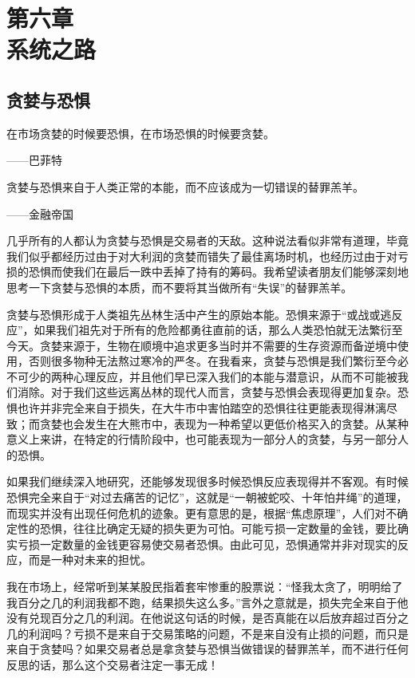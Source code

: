\section[第六章\q 系统之路]{第六章\\ 系统之路}

\subsection{贪婪与恐惧}

{\kaishu
在市场贪婪的时候要恐惧，在市场恐惧的时候要贪婪。

\hfill ——巴菲特

贪婪与恐惧来自于人类正常的本能，而不应该成为一切错误的替罪羔羊。

\hfill ——金融帝国
}

几乎所有的人都认为贪婪与恐惧是交易者的天敌。这种说法看似非常有道理，毕竟我们似乎都经历过由于对大利润的贪婪而错失了最佳离场时机，也经历过由于对亏损的恐惧而使我们在最后一跌中丢掉了持有的筹码。我希望读者朋友们能够深刻地思考一下贪婪与恐惧的本质，而不要将其当做所有“失误”的替罪羔羊。

贪婪与恐惧形成于人类祖先丛林生活中产生的原始本能。恐惧来源于“或战或逃反应”，如果我们祖先对于所有的危险都勇往直前的话，那么人类恐怕就无法繁衍至今天。贪婪来源于，生物在顺境中追求更多当时并不需要的生存资源而备逆境中使用，否则很多物种无法熬过寒冷的严冬。在我看来，贪婪与恐惧是我们繁衍至今必不可少的两种心理反应，并且他们早已深入我们的本能与潜意识，从而不可能被我们消除。对于我们这些远离丛林的现代人而言，贪婪与恐惧会表现得更加复杂。恐惧也许并非完全来自于损失，在大牛市中害怕踏空的恐惧往往更能表现得淋漓尽致；而贪婪也会发生在大熊市中，表现为一种希望以更低价格买入的贪婪。从某种意义上来讲，在特定的行情阶段中，也可能表现为一部分人的贪婪，与另一部分人的恐惧。

如果我们继续深入地研究，还能够发现很多时候恐惧反应表现得并不客观。有时候恐惧完全来自于“对过去痛苦的记忆”，这就是“一朝被蛇咬、十年怕井绳”的道理，而现实并没有出现任何危机的迹象。更有意思的是，根据“焦虑原理”，人们对不确定性的恐惧，往往比确定无疑的损失更为可怕。可能亏损一定数量的金钱，要比确实亏损一定数量的金钱更容易使交易者恐惧。由此可见，恐惧通常并非对现实的反应，而是一种对未来的担忧。

我在市场上，经常听到某某股民指着套牢惨重的股票说：“怪我太贪了，明明给了我百分之几的利润我都不跑，结果损失这么多。”言外之意就是，损失完全来自于他没有兑现百分之几的利润。在他说这句话的时候，是否真能在以后放弃超过百分之几的利润吗？亏损不是来自于交易策略的问题，不是来自没有止损的问题，而只是来自于贪婪吗？如果交易者总是拿贪婪与恐惧当做错误的替罪羔羊，而不进行任何反思的话，那么这个交易者注定一事无成！

